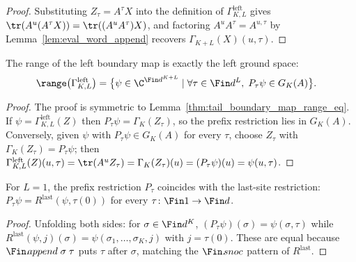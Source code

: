 \begin{proof}
    \leanok
    Substituting $Z_\tau=A^\tau X$ into the definition of
    $\Gamma^{\mathrm{left}}_{K,L}$ gives
    $\tr(A^u(A^\tau X))=\tr((A^u A^\tau)X)$, and factoring
    $A^u A^\tau=A^{u,\tau}$ by Lemma~\ref{lem:eval_word_append} recovers
    $\Gamma_{K+L}(X)(u,\tau)$.
\end{proof}

\begin{lemma}\label{thm:left_boundary_map_range_eq}
    \leanok
    The range of the left boundary map is exactly the left ground space:
    \begin{align}
        \range\bigl(\Gamma^{\mathrm{left}}_{K,L}\bigr)
         & =\bigl\{\psi\in\C^{\Fin d^{K+L}}
        \mid \forall \tau\in\Fin d^L,\;
        P_\tau\psi\in G_K(A)\bigr\}.
    \end{align}
\end{lemma}

\begin{proof}
    \leanok
    The proof is symmetric to Lemma~\ref{thm:tail_boundary_map_range_eq}.
    If $\psi=\Gamma^{\mathrm{left}}_{K,L}(Z)$ then
    $P_\tau\psi=\Gamma_K(Z_\tau)$, so the prefix restriction lies in $G_K(A)$.
    Conversely, given $\psi$ with $P_\tau\psi\in G_K(A)$ for every $\tau$, choose
    $Z_\tau$ with $\Gamma_K(Z_\tau)=P_\tau\psi$; then
    $\Gamma^{\mathrm{left}}_{K,L}(Z)(u,\tau)=\tr(A^u Z_\tau)
        =\Gamma_K(Z_\tau)(u)=(P_\tau\psi)(u)=\psi(u,\tau)$.
\end{proof}

\begin{lemma}[Prefix restriction at $L=1$]\label{lem:prefix_restrict_one_eq_restrict_last}
    \leanok
    For $L=1$, the prefix restriction $P_\tau$ coincides with the last-site
    restriction: $P_\tau\psi=R^{\mathrm{last}}(\psi,\tau(0))$ for every
    $\tau\colon\Fin 1\to\Fin d$.
\end{lemma}

\begin{proof}
    \leanok
    Unfolding both sides: for $\sigma\in\Fin d^K$,
    $(P_\tau\psi)(\sigma)=\psi(\sigma,\tau)$ while
    $R^{\mathrm{last}}(\psi,j)(\sigma)=\psi(\sigma_1,\dots,\sigma_K,j)$ with
    $j=\tau(0)$.  These are equal because $\Fin.\!append\;\sigma\;\tau$ puts
    $\tau$ after $\sigma$, matching the $\Fin.\!snoc$ pattern of $R^{\mathrm{last}}$.
\end{proof}


